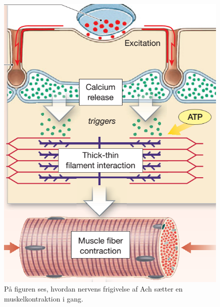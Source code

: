 \begin{figure}[H]
	\centering
	\includegraphics[scale=0.7]{figures/bProblemanalyse/Aktion1.png}
	\caption{På figuren ses, hvordan nervens frigivelse af Ach sætter en muskelkontraktion i gang. \cite{Martini2012}}
	\label{nervemuskel}
\end{figure}
